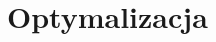 \documentclass[../mn-notatki.tex]{subfiles}
\begin{document}
\section{Optymalizacja}

\pagebreak
\end{document}
